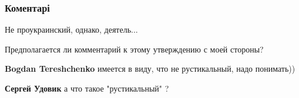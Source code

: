  
 
 
 
 
\subsubsection{Коментарі}

\begin{itemize}
 
Не проукраинский, однако, деятель...

\begin{itemize}
 
Предполагается ли комментарий к этому утверждению с моей стороны? \Smiley[1.0][yellow]

 
\textbf{Bogdan Tereshchenko} имеется в виду, что не рустикальный, надо понимать))

 
\textbf{Сергей Удовик} а что такое "рустикальный" ?

 

\end{itemize}
\end{itemize}

